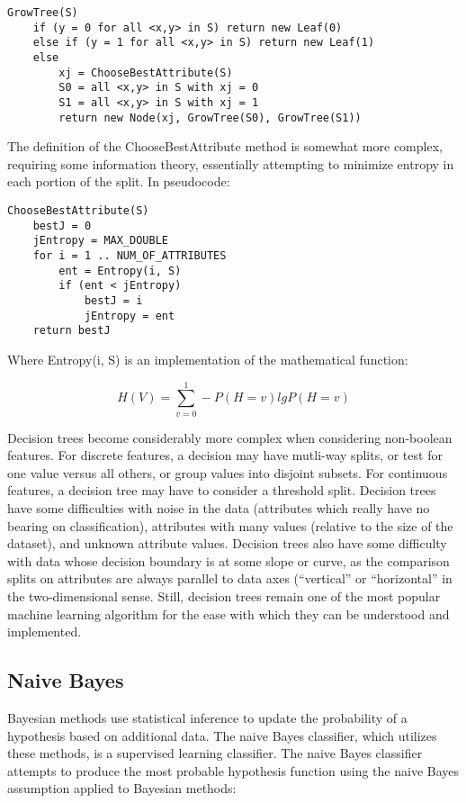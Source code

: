 \begin{verbatim}
GrowTree(S)
    if (y = 0 for all <x,y> in S) return new Leaf(0)
    else if (y = 1 for all <x,y> in S) return new Leaf(1)
    else 
        xj = ChooseBestAttribute(S)
        S0 = all <x,y> in S with xj = 0
        S1 = all <x,y> in S with xj = 1
        return new Node(xj, GrowTree(S0), GrowTree(S1))
\end{verbatim}

The definition of the ChooseBestAttribute method is somewhat more complex, requiring some information theory, essentially attempting to minimize entropy in each portion of the split. In pseudocode:

\begin{verbatim}
ChooseBestAttribute(S)
    bestJ = 0
    jEntropy = MAX_DOUBLE
    for i = 1 .. NUM_OF_ATTRIBUTES
        ent = Entropy(i, S)
        if (ent < jEntropy)
            bestJ = i
            jEntropy = ent
    return bestJ
\end{verbatim}

Where Entropy(i, S) is an implementation of the mathematical function: 

\[H(V)=\sum_{v=0}^1-P(H=v)lgP(H=v)\] 

Decision trees become considerably more complex when considering non-boolean features. For discrete features, a decision may have mutli-way splits, or test for one value versus all others, or group values into disjoint subsets. For continuous features, a decision tree may have to consider a threshold split. Decision trees have some difficulties with noise in the data (attributes which really have no bearing on classification), attributes with many values (relative to the size of the dataset), and unknown attribute values. Decision trees also have some difficulty with data whose decision boundary is at some slope or curve, as the comparison splits on attributes are always parallel to data axes (``vertical'' or ``horizontal'' in the two-dimensional sense. Still, decision trees remain one of the most popular machine learning algorithm for the ease with which they can be understood and implemented.


\subsection{Naive Bayes}

Bayesian methods use statistical inference to update the probability of a hypothesis based on additional data. The naive Bayes classifier, which utilizes these methods, is a supervised learning classifier. The naive Bayes classifier attempts to produce the most probable hypothesis function using the naive Bayes assumption applied to Bayesian methods:


